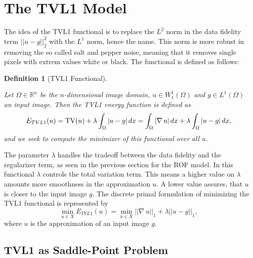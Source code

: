 \documentclass{scrreprt}
\newtheorem{definition}[theorem]{Definition}
\begin{document}


    \section{The TVL1 Model} %
    \label{sec:the_tvl1_model}
        
        The idea of the TVL1 functional is to replace the $L^{2}$ norm in the data fidelity term $||u - g||_{2}^{2}$ with the $L^{1}$ norm, hence the name. This norm is more robust in removing the so called salt and pepper noise, meaning that it removes single pixels with extrem values white or black. The functional is defined as follows:

        \begin{definition}[TVL1 Functional] %
        \label{def:tvl1_functional}

            Let $\Omega \in \mathbb{R}^{n}$ be the $n$-dimensional image domain, $u \in W_{1}^{1}(\Omega)$ and $g \in L^{1}(\Omega)$ an input image. Then the TVL1 energy function is defined as
                \begin{equation}
                    E_{TVL1}(u) = \textnormal{TV}(u) + \lambda \int_{\Omega} |u - g| \, dx = \int_{\Omega} |\nabla \, u| \, dx + \lambda \int_{\Omega} |u - g| \, dx,
                \end{equation}
            and we seek to compute the minimizer of this functional over all $u$.

        \end{definition}

        The parameter $\lambda$ handles the tradeoff between the data fidelity and the regularizer term, as seen in the previous section for the ROF model. In this functional $\lambda$ controls the total variation term. This means a higher value on $\lambda$ amounts more smoothness in the approximation $u$. A lower value assures, that $u$ is closer to the input image $g$. The discrete primal formulation of minimizing the TVL1 functional is represented by
            $$
                \min_{u \in X} E_{TVL1}(u) = \min_{u \in X} ||\nabla \, u||_{1} + \lambda ||u - g||_{1},
            $$
        where $u$ is the approximation of an input image $g$.

        \subsection{TVL1 as Saddle-Point Problem} %
        \label{sub:tvl1_as_saddle_point_problem}
\end{document}
